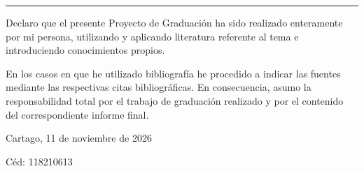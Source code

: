 \thispagestyle{empty}

\rule{10mm}{0pt}

\vfill

Declaro que el presente Proyecto de Graduación ha sido realizado enteramente
por mi persona, utilizando y aplicando literatura referente al tema e
introduciendo conocimientos propios.

En los casos en que he utilizado bibliografía he procedido a indicar las
fuentes mediante las respectivas citas bibliográficas.  En consecuencia,
asumo la responsabilidad total por el trabajo de graduación realizado y por
el contenido del correspondiente informe final.



\vspace*{8mm}

\begin{flushright}
  \scriptAuthor\par
  Cartago, 11 de noviembre de 2026\par
  Céd: 118210613
\end{flushright}



